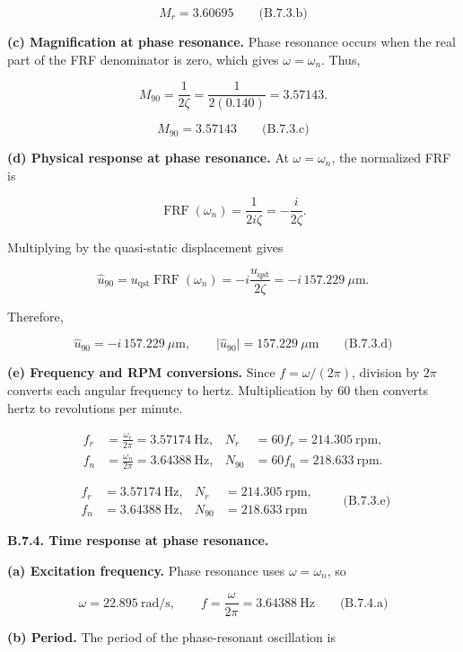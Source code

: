 \[
\boxed{M_r=3.60695}
\qquad\text{(B.7.3.b)}
\]

\textbf{(c) Magnification at phase resonance.} Phase resonance occurs when the real part of the FRF denominator is zero, which gives $\omega=\omega_n$. Thus,

\[
M_{90}=\frac{1}{2\zeta}
 =\frac{1}{2(0.140)}
 =3.57143.
\]

\[
\boxed{M_{90}=3.57143}
\qquad\text{(B.7.3.c)}
\]

\textbf{(d) Physical response at phase resonance.} At $\omega=\omega_n$, the normalized FRF is

\[
\operatorname{FRF}(\omega_n)
 =\frac{1}{2i\zeta}
 =-\frac{i}{2\zeta}.
\]

Multiplying by the quasi-static displacement gives

\[
\hat u_{90}
 =u_{\mathrm{qst}}\operatorname{FRF}(\omega_n)
 =-i\frac{u_{\mathrm{qst}}}{2\zeta}
 =-i\,157.229\ \mu\mathrm{m}.
\]

Therefore,

\[
\boxed{\hat u_{90}=-i\,157.229\ \mu\mathrm{m},
\qquad
\lvert\hat u_{90}\rvert=157.229\ \mu\mathrm{m}}
\qquad\text{(B.7.3.d)}
\]

\textbf{(e) Frequency and RPM conversions.} Since $f=\omega/(2\pi)$, division by $2\pi$ converts each angular frequency to hertz. Multiplication by $60$ then converts hertz to revolutions per minute.

\[
\begin{aligned}
f_r&=\frac{\omega_r}{2\pi}=3.57174\ \mathrm{Hz},
&N_r&=60f_r=214.305\ \mathrm{rpm},\\
f_n&=\frac{\omega_n}{2\pi}=3.64388\ \mathrm{Hz},
&N_{90}&=60f_n=218.633\ \mathrm{rpm}.
\end{aligned}
\]

\[
\boxed{
\begin{aligned}
f_r&=3.57174\ \mathrm{Hz},&N_r&=214.305\ \mathrm{rpm},\\
f_n&=3.64388\ \mathrm{Hz},&N_{90}&=218.633\ \mathrm{rpm}
\end{aligned}}
\qquad\text{(B.7.3.e)}
\]

\textbf{B.7.4. Time response at phase resonance.}

\textbf{(a) Excitation frequency.} Phase resonance uses $\omega=\omega_n$, so

\[
\boxed{\omega=22.895\ \mathrm{rad/s},
\qquad
f=\frac{\omega}{2\pi}=3.64388\ \mathrm{Hz}}
\qquad\text{(B.7.4.a)}
\]

\textbf{(b) Period.} The period of the phase-resonant oscillation is

